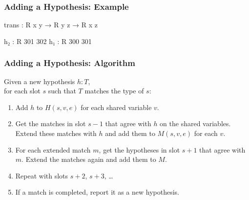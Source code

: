\begin{frame}[fragile]
  \frametitle{Adding a Hypothesis: Example}

  \begin{leancode}
    trans : R x y → R y z → R x z

    h₂ : R 301 302
    h₁ : R 300 301
  \end{leancode}

\end{frame}

\begin{frame}
  \frametitle{Adding a Hypothesis: Algorithm}

  Given a new hypothesis $h : T$, \\
  for each slot $s$ such that $T$ matches the type of $s$:
  \begin{enumerate}
    \item Add $h$ to $H(s, v, e)$ for each shared variable $v$.
    \item Get the matches in slot $s-1$ that agree with $h$ on the shared
          variables.
          Extend these matches with $h$ and add them to $M(s, v, e)$ for each $v$.
    \item For each extended match $m$, get the hypotheses in slot $s + 1$ that
          agree with $m$. Extend the matches again and add them to $M$.
    \item Repeat with slots $s + 2$, $s + 3$, \dots
    \item If a match is completed, report it as a new hypothesis.
  \end{enumerate}
\end{frame}

